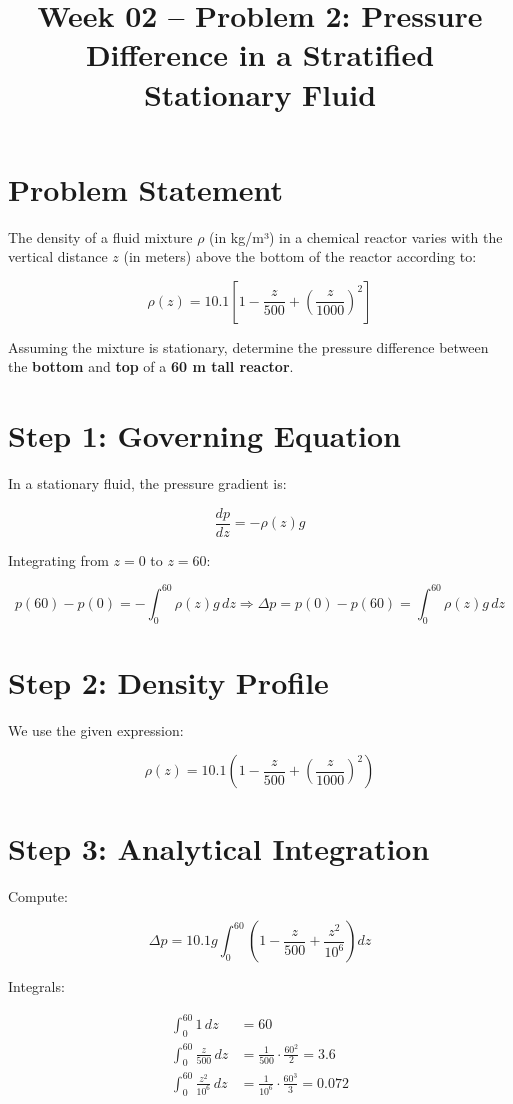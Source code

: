 \documentclass[12pt]{article}
\title{Week 02 -- Problem 2: Pressure Difference in a Stratified Stationary Fluid}
\date{}
\begin{document}
\maketitle

\section*{Problem Statement}

The density of a fluid mixture $\rho$ (in kg/m³) in a chemical reactor varies with the vertical distance $z$ (in meters) above the bottom of the reactor according to:

\[
\rho(z) = 10.1 \left[1 - \frac{z}{500} + \left( \frac{z}{1000} \right)^2 \right]
\]

Assuming the mixture is stationary, determine the pressure difference between the \textbf{bottom} and \textbf{top} of a \textbf{60 m tall reactor}.

\section*{Step 1: Governing Equation}

In a stationary fluid, the pressure gradient is:

\[
\frac{dp}{dz} = -\rho(z) g
\]

Integrating from $z = 0$ to $z = 60$:

\[
p(60) - p(0) = -\int_0^{60} \rho(z) g \, dz
\Rightarrow
\Delta p = p(0) - p(60) = \int_0^{60} \rho(z) g \, dz
\]

\section*{Step 2: Density Profile}

We use the given expression:

\[
\rho(z) = 10.1 \left(1 - \frac{z}{500} + \left( \frac{z}{1000} \right)^2 \right)
\]

\section*{Step 3: Analytical Integration}

Compute:

\[
\Delta p = 10.1 g \int_0^{60} \left(1 - \frac{z}{500} + \frac{z^2}{10^6} \right) dz
\]

Integrals:

\begin{align*}
\int_0^{60} 1 \, dz &= 60 \\
\int_0^{60} \frac{z}{500} \, dz &= \frac{1}{500} \cdot \frac{60^2}{2} = 3.6 \\
\int_0^{60} \frac{z^2}{10^6} \, dz &= \frac{1}{10^6} \cdot \frac{60^3}{3} = 0.072
\end{align*}
\end{document}
